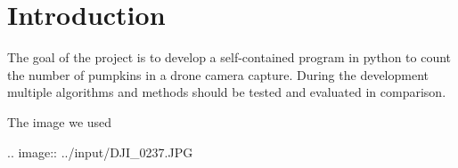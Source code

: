 \documentclass[../Head/Main.tex]{subfiles}
\begin{document}
\section{Introduction}

The goal of the project is to develop a self-contained program in python to count the number of pumpkins in a drone camera capture.
During the development multiple algorithms and methods should be tested and evaluated in comparison.

The image we used

.. image:: ../input/DJI_0237.JPG
\end{document}
